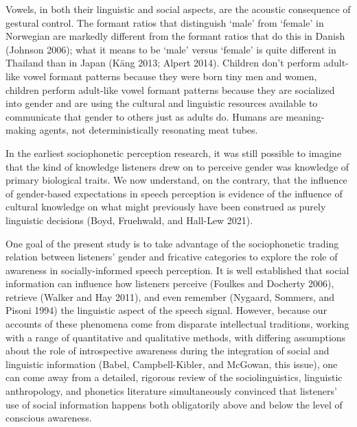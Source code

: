 \documentclass[
  letterpaper,
  DIV=11,
  numbers=noendperiod]{scrartcl}
\begin{document}
Vowels, in both their linguistic and social aspects, are the acoustic
consequence of gestural control. The formant ratios that distinguish
`male' from `female' in Norwegian are markedly different from the
formant ratios that do this in Danish (Johnson 2006); what it means to
be `male' versus `female' is quite different in Thailand than in Japan
(Käng 2013; Alpert 2014). Children don't perform adult-like vowel
formant patterns because they were born tiny men and women, children
perform adult-like vowel formant patterns because they are socialized
into gender and are using the cultural and linguistic resources
available to communicate that gender to others just as adults do. Humans
are meaning-making agents, not deterministically resonating meat tubes.

In the earliest sociophonetic perception research, it was still possible
to imagine that the kind of knowledge listeners drew on to perceive
gender was knowledge of primary biological traits. We now understand, on
the contrary, that the influence of gender-based expectations in speech
perception is evidence of the influence of cultural knowledge on what
might previously have been construed as purely linguistic decisions
(Boyd, Fruehwald, and Hall-Lew 2021).

One goal of the present study is to take advantage of the sociophonetic
trading relation between listeners' gender and fricative categories to
explore the role of awareness in socially-informed speech perception. It
is well established that social information can influence how listeners
perceive (Foulkes and Docherty 2006), retrieve (Walker and Hay 2011),
and even remember (Nygaard, Sommers, and Pisoni 1994) the linguistic
aspect of the speech signal. However, because our accounts of these
phenomena come from disparate intellectual traditions, working with a
range of quantitative and qualitative methods, with differing
assumptions about the role of introspective awareness during the
integration of social and linguistic information (Babel,
Campbell-Kibler, and McGowan, this issue), one can come away from a
detailed, rigorous review of the sociolinguistics, linguistic
anthropology, and phonetics literature simultaneously convinced that
listeners' use of social information happens both obligatorily above and
below the level of conscious awareness.
\end{document}
